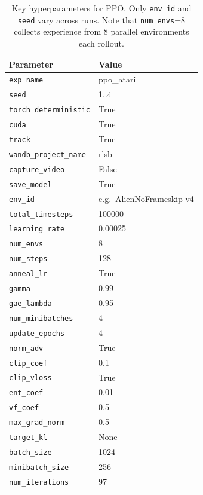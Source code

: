 \begin{table}
	\caption{Key hyperparameters for PPO. Only \texttt{env\_id} and \texttt{seed} vary across runs. 
		Note that \texttt{num\_envs}=8 collects experience from 8 parallel environments each rollout.}
	\label{tab:ppo_hyperparams}
	\centering
	\begin{tabular}{ll}
		\toprule
		\textbf{Parameter} & \textbf{Value} \\
		\midrule
		\texttt{exp\_name}            & ppo\_atari \\
		\texttt{seed}                 & 1..4 \\
		\texttt{torch\_deterministic} & True \\
		\texttt{cuda}                 & True \\
		\texttt{track}                & True \\
		\texttt{wandb\_project\_name} & rlsb \\
		\texttt{capture\_video}       & False \\
		\texttt{save\_model}          & True \\
		\texttt{env\_id}              & e.g.\ AlienNoFrameskip-v4 \\
		\texttt{total\_timesteps}     & 100000 \\
		\texttt{learning\_rate}       & 0.00025 \\
		\texttt{num\_envs}            & 8 \\
		\texttt{num\_steps}           & 128 \\
		\texttt{anneal\_lr}           & True \\
		\texttt{gamma}                & 0.99 \\
		\texttt{gae\_lambda}          & 0.95 \\
		\texttt{num\_minibatches}     & 4 \\
		\texttt{update\_epochs}       & 4 \\
		\texttt{norm\_adv}            & True \\
		\texttt{clip\_coef}           & 0.1 \\
		\texttt{clip\_vloss}          & True \\
		\texttt{ent\_coef}            & 0.01 \\
		\texttt{vf\_coef}             & 0.5 \\
		\texttt{max\_grad\_norm}      & 0.5 \\
		\texttt{target\_kl}           & None \\
		\texttt{batch\_size}          & 1024 \\
		\texttt{minibatch\_size}      & 256 \\
		\texttt{num\_iterations}      & 97 \\
		\bottomrule
	\end{tabular}
\end{table}

